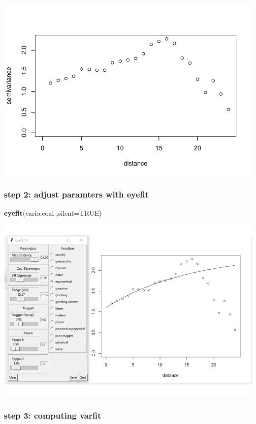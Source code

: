 \documentclass[]{article}
\newenvironment{Shaded}{\begin{snugshade}}{\end{snugshade}}
\newcommand{\KeywordTok}[1]{\textcolor[rgb]{0.13,0.29,0.53}{\textbf{#1}}}
\newcommand{\DataTypeTok}[1]{\textcolor[rgb]{0.13,0.29,0.53}{#1}}
\newcommand{\OtherTok}[1]{\textcolor[rgb]{0.56,0.35,0.01}{#1}}
\newcommand{\NormalTok}[1]{#1}
\begin{document}
\includegraphics{Homework3_files/figure-latex/7x_vario-1.pdf}

\subsubsection{step 2: adjust paramters with
eyefit}\label{step-2-adjust-paramters-with-eyefit-1}

\begin{Shaded}
\begin{Highlighting}[]
\KeywordTok{eyefit}\NormalTok{(vario.coal ,}\DataTypeTok{silent=}\OtherTok{TRUE}\NormalTok{)}
\end{Highlighting}
\end{Shaded}

\includegraphics{Homework3_files/figure-latex/ex7_3dd-1.pdf}

\subsubsection{step 3: computing
varfit}\label{step-3-computing-varfit-1}
\end{document}
